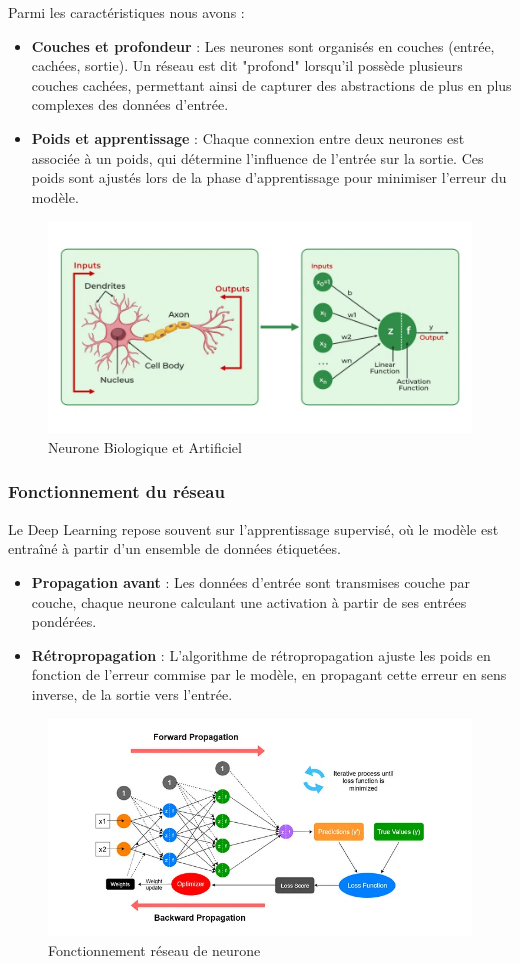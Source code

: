 	 Parmi les caractéristiques nous avons : 
	\begin{itemize}
		\item \textbf{Couches et profondeur} : Les neurones sont organisés en couches (entrée, cachées, sortie). Un réseau est dit "profond" lorsqu'il possède plusieurs couches cachées, permettant ainsi de capturer des abstractions de plus en plus complexes des données d'entrée.
		\item \textbf{Poids et apprentissage} : Chaque connexion entre deux neurones est associée à un poids, qui détermine l'influence de l'entrée sur la sortie. Ces poids sont ajustés lors de la phase d'apprentissage pour minimiser l'erreur du modèle.
	\end{itemize}
	\begin{figure}[h!]
		\centering
		\includegraphics[width=0.6\linewidth]{images/Artificial-Neural-Networks}
		\caption[Neurone Biolique en Artificiel]{Neurone Biologique et Artificiel}
		\label{fig:ann}
	\end{figure}
	
\subsubsection{Fonctionnement du réseau}
	Le Deep Learning repose souvent sur l'apprentissage supervisé, où le modèle est entraîné à partir d'un ensemble de données étiquetées.
	\begin{itemize}
		\item \textbf{Propagation avant} : Les données d'entrée sont transmises couche par couche, chaque neurone calculant une activation à partir de ses entrées pondérées.
		\item \textbf{Rétropropagation} : L'algorithme de rétropropagation ajuste les poids en fonction de l'erreur commise par le modèle, en propagant cette erreur en sens inverse, de la sortie vers l'entrée.
	\end{itemize}
	\begin{figure}[h!]
		\centering
		\includegraphics[width=0.8\linewidth]{images/Backward-Propagation}
		\caption[Foward-Backward-Propagation]{Fonctionnement réseau de neurone}
		\label{fig:backward-propagation}
	\end{figure}
	
